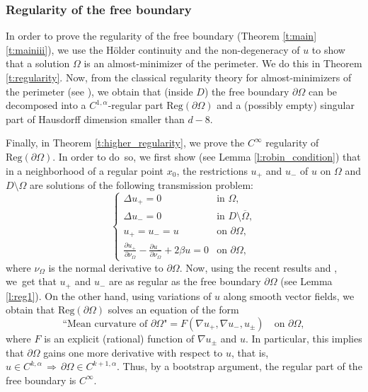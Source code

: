 \documentclass[JEP,XML,SOM,Unicode]{cedram}
\theoremstyle{plain}
\theoremstyle{definition}
\let\ds\displaystyle
\begin{document}
\subsubsection{Regularity of the free boundary} In order to prove the regularity of the free boundary (Theorem \ref{t:main}\eqref{t:mainiii}), we use the Hölder continuity and the non-degeneracy of $u$ to show that a solution $\Omega$ is an almost-minimizer of the perimeter. We do this in Theorem \ref{t:regularity}. Now, from the classical regularity theory for almost-minimizers of the perimeter (see \cite{tamanini}), we obtain that (inside $D$) the free boundary $\partial\Omega$ can be decomposed into a $C^{1,\alpha}$-regular part $\text{Reg}(\partial\Omega)$ and a (possibly empty) singular part of Hausdorff dimension smaller than $d-8$.

Finally, in Theorem \ref{t:higher_regularity}, we prove the $C^\infty$ regularity of $\text{Reg}(\partial\Omega)$. In order to do~so, we first show (see Lemma \ref{l:robin_condition}) that in a neighborhood of a regular point $x_0$, the restrictions $u_+$ and $u_-$ of $u$ on $\Omega$ and $D\setminus\Omega$ are solutions of the following transmission problem:
\[\begin{cases}
\Delta u_+=0&\text{in } \Omega,\\
\Delta u_-=0&\text{in } D\setminus\overline\Omega,\\
u_+=u_-=u&\text{on }\partial\Omega,\\
\ds\frac{\partial u_+}{\partial \nu_\Omega}-\frac{\partial u_-}{\partial \nu_\Omega}+2\beta u=0&\text{on } \partial\Omega,
\end{cases}\]
where $\nu_\Omega$ is the normal derivative to $\partial\Omega$. Now, using the recent results \cite{css} and \cite{D}, we~get that $u_+$ and $u_-$ are as regular as the free boundary $\partial\Omega$ (see Lemma \ref{l:reg1}). On the other hand, using variations of $u$ along smooth vector fields, we obtain that $\text{Reg}(\partial\Omega)$ solves an equation of the form
\[\text{``Mean curvature of $\partial\Omega$"}=F(\nabla u_+,\nabla u_-,u_\pm)\quad\text{on } \partial\Omega,\]
where $F$ is an explicit (rational) function of $\nabla u_\pm$ and $u$.
In particular, this implies that $\partial\Omega$ gains one more derivative with respect to $u$, that is, $u\in C^{k,\alpha}\,\Rightarrow\,\partial\Omega\in C^{k+1,\alpha}$. Thus, by a bootstrap argument, the regular part of the free boundary is $C^\infty$.
\end{document}
